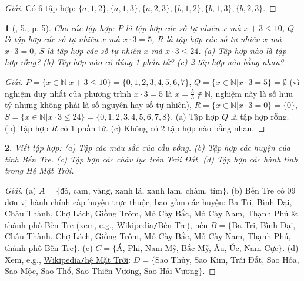 \documentclass{article}
\newtheorem{baitoan}{}
\begin{document}
\begin{proof}[Giải]
	Có 6 tập hợp: $\{a,1,2\},\{a,1,3\},\{a,2,3\},\{b,1,2\},\{b,1,3\},\{b,2,3\}$.
\end{proof}

\begin{baitoan}[\cite{Tuyen_Toan_6}, 5., p. 5]
	Cho các tập hợp: $P$ là tập hợp các số tự nhiên $x$ mà $x + 3\le10$, $Q$ là tập hợp các số tự nhiên $x$ mà $x\cdot3 = 5$, $R$ là tập hợp các số tự nhiên $x$ mà $x\cdot3 = 0$, $S$ là tập hợp các số tự nhiên $x$ mà $x\cdot3\le24$. (a) Tập hợp nào là tập hợp rỗng? (b) Tập hợp nào có đúng 1 phần tử? (c) 2 tập hợp nào bằng nhau?
\end{baitoan}

\begin{proof}[Giải]
	$P = \{x\in\mathbb{N}|x + 3\le10\} = \{0,1,2,3,4,5,6,7\}$, $Q = \{x\in\mathbb{N}|x\cdot3 = 5\} = \emptyset$ (vì nghiệm duy nhất của phương trình $x\cdot3 = 5$ là $x = \frac{5}{3}\notin\mathbb{N}$, nghiệm này là số hữu tỷ nhưng không phải là số nguyên hay số tự nhiên), $R = \{x\in\mathbb{N}|x\cdot3 = 0\} = \{0\}$, $S = \{x\in\mathbb{N}|x\cdot3\le24\} = \{0,1,2,3,4,5,6,7,8\}$. (a) Tập hợp $Q$ là tập hợp rỗng. (b) Tập hợp $R$ có 1 phần tử. (c) Không có 2 tập hợp nào bằng nhau.
\end{proof}

\begin{baitoan}
	Viết tập hợp: (a) Tập các màu sắc của cầu vồng. (b) Tập hợp các huyện của tỉnh Bến Tre. (c) Tập hợp các châu lục trên Trái Đất. (d) Tập hợp các hành tinh trong Hệ Mặt Trời.
\end{baitoan}

\begin{proof}[Giải]
	(a) $A = \{\mbox{đỏ, cam, vàng, xanh lá, xanh lam, chàm, tím}\}$. (b) Bến Tre có 09 đơn vị hành chính cấp huyện trực thuộc, bao gồm các huyện: Ba Tri, Bình Đại, Châu Thành, Chợ Lách, Giồng Trôm, Mỏ Cày Bắc, Mỏ Cày Nam, Thạnh Phú \& thành phố Bến Tre (xem, e.g., \href{https://vi.wikipedia.org/wiki/B%E1%BA%BFn_Tre}{Wikipedia{\tt/}Bến Tre}), nên $B = \{$Ba Tri, Bình Đại, Châu Thành, Chợ Lách, Giồng Trôm, Mỏ Cày Bắc, Mỏ Cày Nam, Thạnh Phú, thành phố Bến Tre$\}$. (c) $C = \{$Á, Phi, Nam Mỹ, Bắc Mỹ, Âu, Úc, Nam Cực$\}$. (d) Xem, e.g., \href{https://vi.wikipedia.org/wiki/H%E1%BB%87_M%E1%BA%B7t_Tr%E1%BB%9Di}{Wikipedia{\tt/}hệ Mặt Trời}: $D = \{$Sao Thủy, Sao Kim, Trái Đất, Sao Hỏa, Sao Mộc, Sao Thổ, Sao Thiên Vương, Sao Hải Vương$\}$.
\end{proof}

\end{document}

